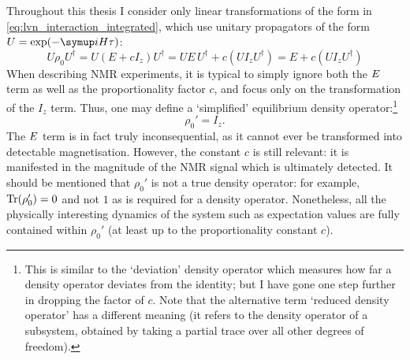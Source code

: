 Throughout this thesis I consider only linear transformations of the form in \cref{eq:lvn_interaction_integrated}, which use unitary propagators of the form $U = \exp(-\mi H\tau)$:
\begin{equation}
    \label{eq:unitary_rho0}
    U\rho_0 U^\dagger = U(E + cI_z)U^\dagger = UE\,U^\dagger + c(UI_zU^\dagger) = E + c(UI_zU^\dagger)
\end{equation}
When describing NMR experiments, it is typical to simply ignore both the $E\/$ term as well as the proportionality factor $c$, and focus only on the transformation of the $I_z$ term.
Thus, one may define a `simplified' equilibrium density operator:\footnote{This is similar to the `deviation' density operator\autocite{Chuang1998PRSLA,Jones2011PNMRS} which measures how far a density operator deviates from the identity; but I have gone one step further in dropping the factor of $c$. Note that the alternative term `reduced density operator' has a different meaning (it refers to the density operator of a subsystem, obtained by taking a partial trace over all other degrees of freedom).}
\begin{equation}
    \label{eq:rho0_simplified}
    \rho_0' = I_z.
\end{equation}
The $E\/$ term is in fact truly inconsequential, as it cannot ever be transformed into detectable magnetisation.
However, the constant $c$ is still relevant: it is manifested in the magnitude of the NMR signal which is ultimately detected.
It should be mentioned that $\rho_0'$ is not a true density operator: for example, $\operatorname{Tr}(\rho_0') = 0$ and not $1$ as is required for a density operator.
Nonetheless, all the physically interesting dynamics of the system such as expectation values are fully contained within $\rho_0'$ (at least up to the proportionality constant $c$).
